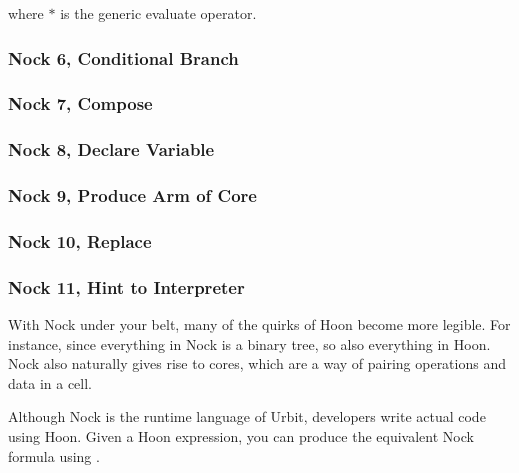 where $*$ is the generic evaluate operator.

\subsubsection[Nock 6]{Nock 6, Conditional Branch}
\subsubsection[Nock 7]{Nock 7, Compose}
\subsubsection[Nock 8]{Nock 8, Declare Variable}
\subsubsection[Nock 9]{Nock 9, Produce Arm of Core}
\subsubsection[Nock 10]{Nock 10, Replace}
\subsubsection[Nock 11]{Nock 11, Hint to Interpreter}


With Nock under your belt, many of the quirks of Hoon become more legible.  For instance, since everything in Nock is a binary tree, so also everything in Hoon.  Nock also naturally gives rise to cores, which are a way of pairing operations and data in a cell.

Although Nock is the runtime language of Urbit, developers write actual code using Hoon.  Given a Hoon expression, you can produce the equivalent Nock formula using \pzaptis.

